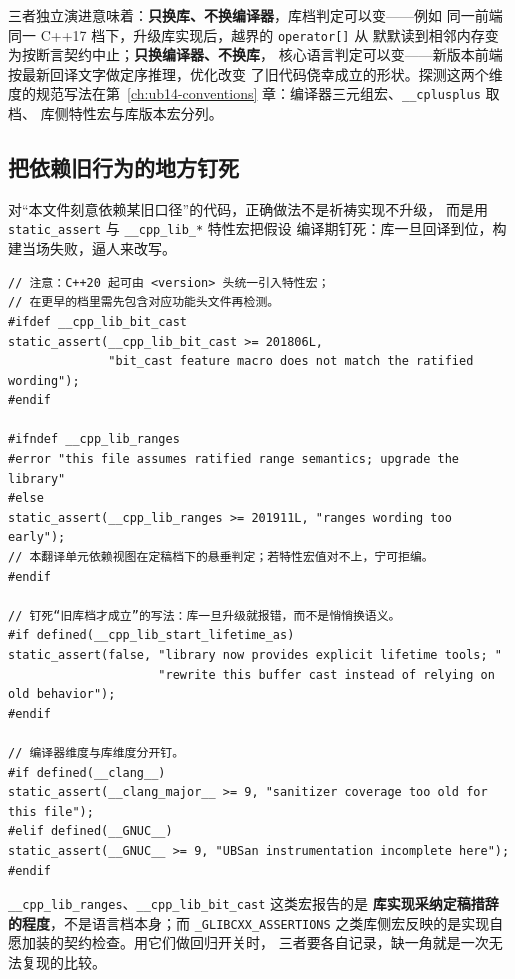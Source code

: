 \documentclass[12pt,a4paper,fontset=fandol]{ctexbook}
\newcommand{\cpp}[1]{C++#1}
\newcommand{\Tp}[1]{\texttt{#1}}
\newcommand{\Feat}[1]{\texttt{#1}}
\begin{document}
三者独立演进意味着：\textbf{只换库、不换编译器}，库档判定可以变——例如
同一前端同一 \cpp{17} 档下，升级库实现后，越界的 \Tp{operator[]} 从
默默读到相邻内存变为按断言契约中止；\textbf{只换编译器、不换库}，
核心语言判定可以变——新版本前端按最新回译文字做定序推理，优化改变
了旧代码侥幸成立的形状。探测这两个维度的规范写法在第~\ref{ch:ub14-conventions} 章：编译器三元组宏、\Tp{\_\_cplusplus} 取档、
库侧特性宏与库版本宏分列。

\subsection{把依赖旧行为的地方钉死}

对“本文件刻意依赖某旧口径”的代码，正确做法不是祈祷实现不升级，
而是用 \Tp{static\_assert} 与 \Feat{\_\_cpp\_lib\_*} 特性宏把假设
编译期钉死：库一旦回译到位，构建当场失败，逼人来改写。

\begin{lstlisting}[style=cppstyle, caption={cppstyle：用特性宏把旧行为依赖钉死在编译期}]
// 注意：C++20 起可由 <version> 头统一引入特性宏；
// 在更早的档里需先包含对应功能头文件再检测。
#ifdef __cpp_lib_bit_cast
static_assert(__cpp_lib_bit_cast >= 201806L,
              "bit_cast feature macro does not match the ratified wording");
#endif

#ifndef __cpp_lib_ranges
#error "this file assumes ratified range semantics; upgrade the library"
#else
static_assert(__cpp_lib_ranges >= 201911L, "ranges wording too early");
// 本翻译单元依赖视图在定稿档下的悬垂判定；若特性宏值对不上，宁可拒编。
#endif

// 钉死“旧库档才成立”的写法：库一旦升级就报错，而不是悄悄换语义。
#if defined(__cpp_lib_start_lifetime_as)
static_assert(false, "library now provides explicit lifetime tools; "
                     "rewrite this buffer cast instead of relying on old behavior");
#endif

// 编译器维度与库维度分开钉。
#if defined(__clang__)
static_assert(__clang_major__ >= 9, "sanitizer coverage too old for this file");
#elif defined(__GNUC__)
static_assert(__GNUC__ >= 9, "UBSan instrumentation incomplete here");
#endif
\end{lstlisting}

\begin{note}[title=特性宏只证实现跟进到哪一步]
\Feat{\_\_cpp\_lib\_ranges}、\Feat{\_\_cpp\_lib\_bit\_cast} 这类宏报告的是
\textbf{库实现采纳定稿措辞的程度}，不是语言档本身；而 \Tp{\_GLIBCXX\_ASSERTIONS}
之类库侧宏反映的是实现自愿加装的契约检查。用它们做回归开关时，
三者要各自记录，缺一角就是一次无法复现的比较。
\end{note}
\end{document}

